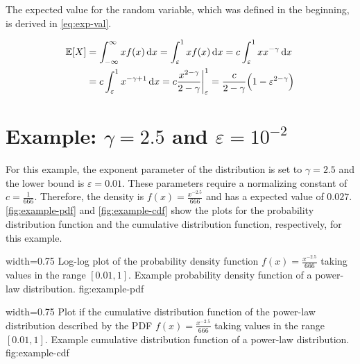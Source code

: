 The expected value for the random variable, which was defined in the beginning, is derived in \cref{eq:exp-val}.


\begin{align}
	\mathbb{E}[{X}] & = \int_{-\infty}^{\infty} x f(x) \, \mathrm{d}x = \int_{\varepsilon}^{1} x f(x) \, \mathrm{d}x = c \int_{\varepsilon}^{1} x x^{-\gamma} \, \mathrm{d}x \\
	    & = c \int_{\varepsilon}^{1} x^{-\gamma+1} \, \mathrm{d}x = c \frac{x^{2-\gamma}}{2-\gamma}  \bigg |_{\varepsilon}^{1} = \frac{c}{2-\gamma} \Big(1 - \varepsilon^{2-\gamma}\Big)
\label{eq:exp-val}
\end{align}



\section{Example: \(\gamma = 2.5\) and \(\varepsilon = 10^{-2}\)}
\label{sec:example}

For this example, the exponent parameter of the distribution is set to \(\gamma = 2.5\) and the lower bound is \(\varepsilon = 0.01\).
These parameters require a normalizing constant of \(c = \frac{1}{666}\).
Therefore, the density is \(f(x) = \frac{x^{-2.5}}{666}\) and has a expected value of \(0.027\).
\cref{fig:example-pdf} and \cref{fig:example-cdf} show the plots for the probability distribution function and the cumulative distribution function, respectively, for this example.

      {width=0.75\textwidth}
      {Log-log plot of the probability density function \(f(x) = \frac{x^{-2.5}}{666}\) taking values in the range \([0.01, 1]\).}
      {Example probability density function of a power-law distribution.}
      {fig:example-pdf}

      {width=0.75\textwidth}
      {Plot if the cumulative distribution function of the power-law distribution described by the PDF \(f(x) = \frac{x^{-2.5}}{666}\) taking values in the range \([0.01, 1]\).}
      {Example cumulative distribution function of a power-law distribution.}
      {fig:example-cdf}




